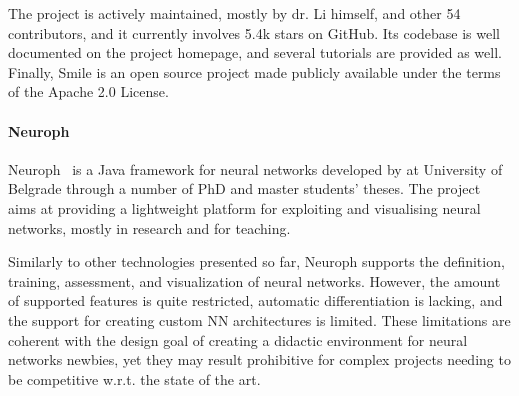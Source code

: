 \documentclass[12pt,a4paper,openright,twoside]{book}
\begin{document}
The project is actively maintained, mostly by dr. Li himself, and other 54 contributors, and it currently involves 5.4k stars on GitHub.
%
Its codebase is well documented on the project homepage, and several tutorials are provided as well.
%
Finally, Smile is an open source project made publicly available under the terms of the Apache 2.0 License.

\paragraph{Neuroph}

Neuroph~\cite{Neuroph} is a Java framework for neural networks developed by at University of Belgrade through a number of PhD and master students' theses.
%
The project aims at providing a lightweight platform for exploiting and visualising neural networks, mostly in research and for teaching.

Similarly to other technologies presented so far, Neuroph supports the definition, training, assessment, and visualization of neural networks.
%
However, the amount of supported features is quite restricted, automatic differentiation is lacking, and the support for creating custom NN architectures is limited.
%
%
These limitations are coherent with the design goal of creating a didactic environment for neural networks newbies, yet they may result prohibitive for complex projects needing to be competitive w.r.t. the state of the art.
\end{document}
